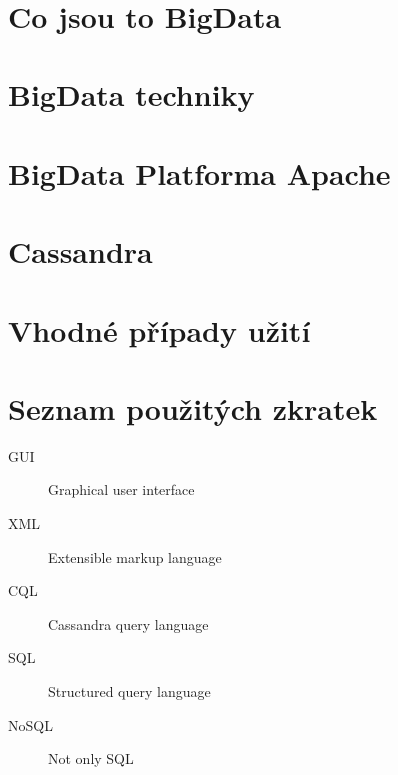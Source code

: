\documentclass[thesis=M,czech]{FITthesis}[2012/06/26]
\title{
}
\begin{document}
	

\begin{introduction}




\end{introduction}


\chapter{Co jsou to BigData}




\chapter{BigData techniky}



\chapter{BigData Platforma Apache}



\chapter{Cassandra}	




\chapter{Vhodné případy užití}



\begin{conclusion}

\end{conclusion}

\nocite{*}



\appendix

\chapter{Seznam použitých zkratek}
\begin{description}
	\item[GUI] Graphical user interface
	\item[XML] Extensible markup language
	\item[CQL] Cassandra query language
	\item[SQL] Structured query language
	\item[NoSQL] Not only SQL
\end{description}
\end{document}
